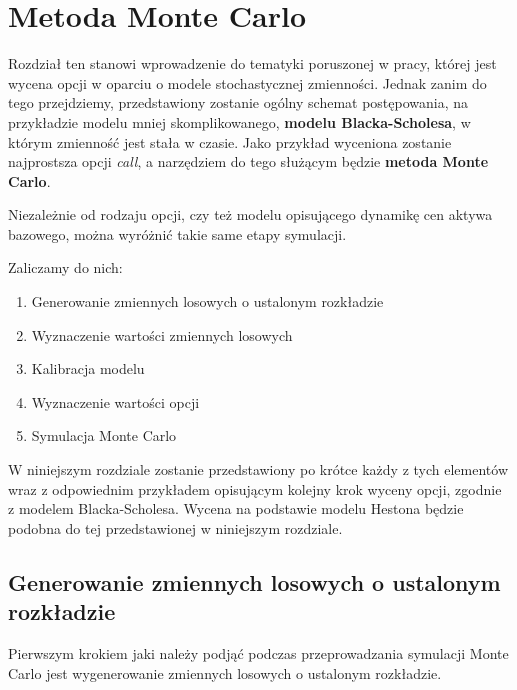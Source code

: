 \documentclass{pracamgr}
\begin{document}
\chapter{Metoda Monte Carlo}
\label{chap:introduction}


 
 

Rozdział ten stanowi wprowadzenie do tematyki poruszonej w pracy, której jest wycena opcji w oparciu
o modele stochastycznej zmienności. 
Jednak zanim do tego przejdziemy, przedstawiony zostanie ogólny schemat postępowania, na przykładzie modelu mniej skomplikowanego, \textbf{modelu Blacka-Scholesa}, w którym zmienność jest stała w czasie.
Jako przykład wyceniona zostanie najprostsza opcji \textit{call}, a narzędziem do tego służącym 
będzie \textbf{metoda Monte Carlo}.

Niezależnie od rodzaju opcji, czy też modelu opisującego dynamikę cen aktywa bazowego, można 
wyróżnić takie same etapy symulacji. 

Zaliczamy do nich:
\begin{enumerate}
  \item Generowanie zmiennych losowych o ustalonym rozkładzie
  \item Wyznaczenie wartości zmiennych losowych
  \item Kalibracja modelu
  \item Wyznaczenie wartości opcji
  \item Symulacja Monte Carlo
\end{enumerate}

W niniejszym rozdziale zostanie przedstawiony po krótce każdy z tych elementów wraz z odpowiednim przykładem opisującym kolejny krok wyceny opcji, zgodnie z modelem Blacka-Scholesa.
Wycena na podstawie modelu Hestona będzie podobna do tej przedstawionej w niniejszym rozdziale.

\section{Generowanie zmiennych losowych o ustalonym rozkładzie}

Pierwszym krokiem jaki należy podjąć podczas przeprowadzania symulacji Monte Carlo jest 
wygenerowanie zmiennych losowych o ustalonym rozkładzie.
\end{document}
